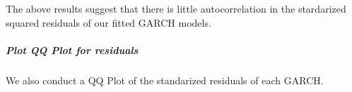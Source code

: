 \documentclass[11pt]{article}
\begin{document}
    \begin{center}
    \end{center}
    { \hspace*{\fill} \\}
    
    \begin{center}
    \end{center}
    { \hspace*{\fill} \\}
    
    The above results suggest that there is little autocorrelation in the
stardarized squared residuals of our fitted GARCH models.

    \subparagraph{Plot QQ Plot for
residuals}\label{plot-qq-plot-for-residuals}

We also conduct a QQ Plot of the standarized residuals of each GARCH.
\end{document}
